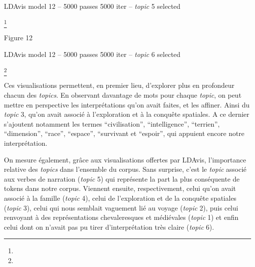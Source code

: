 \documentclass[letterpaper,portrait,12pt]{article}
\begin{document}
LDAvis model 12 -- 5000 passes 5000 iter -- \emph{topic} 5 selected


\footnote{} 


Figure 12





LDAvis model 12 -- 5000 passes 5000 iter -- \emph{topic} 6 selected





\footnote{} 








\textcolor[rgb]{0.000,0.000,0.000}{	Ces visualisations permettent, en premier lieu, d'explorer plus en profondeur chacun des }\emph{\textcolor[rgb]{0.000,0.000,0.000}{topics}}\textcolor[rgb]{0.000,0.000,0.000}{. En observant davantage de mots pour chaque }\emph{\textcolor[rgb]{0.000,0.000,0.000}{topic}}\textcolor[rgb]{0.000,0.000,0.000}{, on peut mettre en perspective les interpr\'{e}tations qu'on avait faites, et les affiner. Ainsi du }\emph{\textcolor[rgb]{0.000,0.000,0.000}{topic}}\textcolor[rgb]{0.000,0.000,0.000}{ 3, qu'on avait associ\'{e} \`{a} l'exploration et \`{a} la conqu\^{e}te spatiales. A ce dernier s'ajoutent notamment les termes {``}civilisation'', {``}intelligence'', {``}terrien'', {``}dimension'', {``}race'', {``}espace'', {``}survivant et {``}espoir'', qui appuient encore notre interpr\'{e}tation.}





\textcolor[rgb]{0.000,0.000,0.000}{	On mesure \'{e}galement, gr\^{a}ce aux visualisations offertes par LDAvis, l'importance relative des }\emph{\textcolor[rgb]{0.000,0.000,0.000}{topics}}\textcolor[rgb]{0.000,0.000,0.000}{ dans l'ensemble du corpus. Sans surprise, c'est le }\emph{\textcolor[rgb]{0.000,0.000,0.000}{topic}}\textcolor[rgb]{0.000,0.000,0.000}{ associ\'{e} aux verbes de narration (}\emph{\textcolor[rgb]{0.000,0.000,0.000}{topic}}\textcolor[rgb]{0.000,0.000,0.000}{ 5) qui repr\'{e}sente la part la plus cons\'{e}quente de tokens dans notre corpus. Viennent ensuite, respectivement, celui qu'on avait associ\'{e} \`{a} la famille (}\emph{\textcolor[rgb]{0.000,0.000,0.000}{topic}}\textcolor[rgb]{0.000,0.000,0.000}{ 4), celui de l'exploration et de la conqu\^{e}te spatiales (}\emph{\textcolor[rgb]{0.000,0.000,0.000}{topic}}\textcolor[rgb]{0.000,0.000,0.000}{ 3), celui qui nous semblait vaguement li\'{e} au voyage (}\emph{\textcolor[rgb]{0.000,0.000,0.000}{topic}}\textcolor[rgb]{0.000,0.000,0.000}{ 2), puis celui renvoyant \`{a} des repr\'{e}sentations chevaleresques et m\'{e}di\'{e}vales (}\emph{\textcolor[rgb]{0.000,0.000,0.000}{topic}}\textcolor[rgb]{0.000,0.000,0.000}{ 1) et enfin celui dont on n'avait pas pu tirer d'interpr\'{e}tation tr\`{e}s claire (}\emph{\textcolor[rgb]{0.000,0.000,0.000}{topic}}\textcolor[rgb]{0.000,0.000,0.000}{ 6).}
\end{document}
